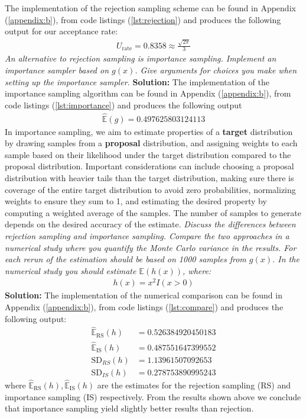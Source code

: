 The implementation of the rejection sampling scheme can be found in Appendix (\ref{appendix:b}), from code listings (\ref{lst:rejection}) and produces the following output for our acceptance rate: 
\begin{align*}
    U_{\text{rate}} = 0.8358 \approx \frac{\sqrt{2 \pi}}{3}
\end{align*}
\emph{An alternative to rejection sampling is importance sampling. Implement an importance
sampler based on $g(x)$. Give arguments for choices you make when setting up the
importance sampler.} \spaze 
\textbf{Solution:} \spaze
The implementation of the importance sampling algorithm can be found in Appendix (\ref{appendix:b}), from code listings (\ref{lst:importance}) and produces the following output
\begin{align*}
    \hat{\mathbb{E}}(g) = 0.497625803124113
\end{align*}
 In importance sampling, we aim to estimate properties of a \textbf{target} distribution by drawing samples from a \textbf{proposal} distribution, and assigning weights to each sample based on their likelihood under the target distribution compared to the proposal distribution. Important considerations can include choosing a proposal distribution with heavier tails than the target distribution, making sure there is coverage of the entire target distribution to avoid zero probabilities, normalizing weights to ensure they sum to 1, and estimating the desired property by computing a weighted average of the samples. The number of samples to generate depends on the desired accuracy of the estimate.
\emph{Discuss the differences between rejection sampling and importance sampling.
Compare the two approaches in a numerical study where you quantify the Monte Carlo variance in the results. For each rerun of the estimation should be based on 1000
samples from $g(x)$. In the numerical study you should estimate $\mathbb{E}(h(x))$, where:}
\begin{align*}
    h(x) = x^2 I(x > 0)
\end{align*}
\textbf{Solution:} \spaze
The implementation of the numerical comparison can be found in Appendix (\ref{appendix:b}), from code listings (\ref{lst:compare}) and produces the following output: 
\begin{align*}
    \hat{\mathbb{E}}_{\text{RS}}(h) &=  0.526384920450183 \\[5pt]
    \hat{\mathbb{E}}_{\text{IS}}(h) &=  0.487551647399552 \\[10pt]
    \text{SD}_{RS}(h) &=  1.13961507092653 \\[5pt]
     \text{SD}_{IS}(h) &= 0.278753890995243
\end{align*}
where $\hat{\mathbb{E}}_{\text{RS}}(h), \hat{\mathbb{E}}_{\text{IS}}(h)$ are the estimates for the rejection sampling (RS) and importance sampling (IS) respectively. From the results shown above we conclude that importance sampling yield slightly better results than rejection.

